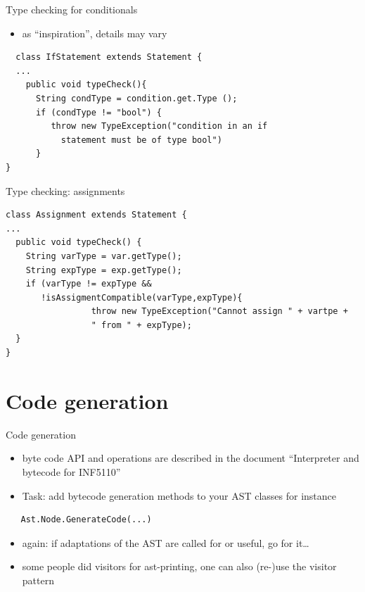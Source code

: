 \documentclass{beamer}
\begin{document}
\begin{frame}[label={sec:orgbbb3838},fragile,plain]{Type checking for conditionals}
 \begin{itemize}
\item as ``inspiration'', details may vary
\end{itemize}


\lstset{language=java,label= ,caption= ,captionpos=b,numbers=none}
\begin{lstlisting}
  class IfStatement extends Statement {
  ...
    public void typeCheck(){
      String condType = condition.get.Type ();
      if (condType != "bool") {  
         throw new TypeException("condition in an if 
           statement must be of type bool")
      }
}
\end{lstlisting}
\end{frame}


\begin{frame}[label={sec:org7afbec9},fragile,plain]{Type checking: assignments}
 \lstset{language=java,label= ,caption= ,captionpos=b,numbers=none}
\begin{lstlisting}
class Assignment extends Statement {
...
  public void typeCheck() {
    String varType = var.getType();
    String expType = exp.getType();
    if (varType != expType &&
       !isAssigmentCompatible(varType,expType){
                 throw new TypeException("Cannot assign " + vartpe + 
                 " from " + expType);
  }
}

\end{lstlisting}
\end{frame}



\section{Code generation}
\label{sec:org73ded3b}
\begin{frame}[label={sec:org015be6a},fragile]{Code generation}
 \begin{itemize}
\item byte code API and operations are described in the document ``Interpreter
and bytecode for INF5110''

\item \alert{Task:} add bytecode generation methods to your AST classes
for instance
\end{itemize}

\begin{verbatim}
   Ast.Node.GenerateCode(...)
\end{verbatim}
\begin{itemize}
\item again: if adaptations of the AST are called for or useful, go for it\ldots{}

\item some people did \alert{visitors} for ast-printing, one can also (re-)use the visitor pattern
\end{itemize}
\end{frame}
\end{document}

